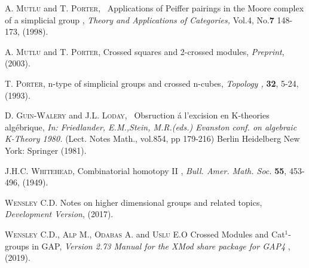 \documentclass[a4paper,11pt]{article}
\theoremstyle{plain}
\theoremstyle{definition}
\begin{document}
\begin{thebibliography}{99}
	 \textsc{A. Mutlu} and \textsc{T. Porter}, \textrm{\
		Applications of Peiffer pairings in the Moore complex of a simplicial group}
	, \emph{Theory and Applications of Categories, } Vol.4, No.\textbf{7}
	148-173, (1998).
	
	 \textsc{A. Mutlu} and \textsc{T. Porter}, \textrm{Crossed
		squares and 2-crossed modules}, \emph{Preprint}, (2003).
	
	 \textsc{T. Porter}, \textrm{n-type of simplicial groups and
		crossed n-cubes}, \emph{Topology ,} \textbf{32}, 5-24, (1993).
	
	 \textsc{D. Guin-Walery} and \textsc{J.L. Loday}, \textrm{\
		Obsruction {\'{a}} l'excision en K-theories alg{\'{e}}brique, } \emph{In:
		Friedlander, E.M.,Stein, M.R.(eds.) Evanston conf. on algebraic K-Theory
		1980.} (Lect. Notes Math., vol.854, pp 179-216) Berlin Heidelberg New York:
	Springer (1981).
	
	 \textsc{J.H.C. Whitehead}, \textrm{Combinatorial homotopy
		II }, \emph{Bull. Amer. Math. Soc.} \textbf{55}, 453-496, (1949).
	
	\bibitem{wensley_notes} \textsc{Wensley C.D.} Notes on higher dimensional
	groups and related topics, \emph{Development Version}, (2017).
	
	 \textsc{Wensley C.D., Alp M., Odabas A.} and \textsc{Uslu E.O }
	Crossed Modules and Cat$^{1}$-groups in \textsf{GAP}, \emph{Version 2.73
		Manual for the \textsf{XMod} share package for \textsf{GAP}4 }, (2019).
\end{thebibliography}
\end{document}
